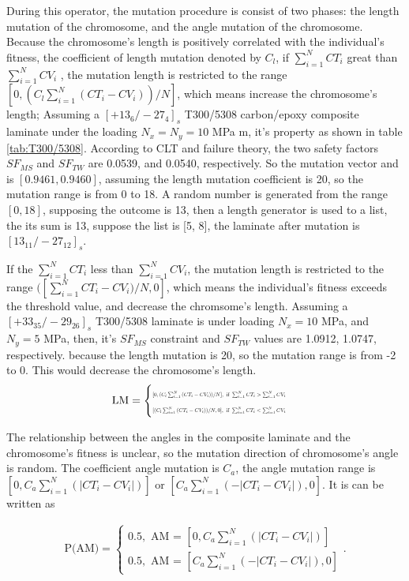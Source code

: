 
During this operator, the mutation procedure is consist of two phases: the length
mutation of the chromosome, and the angle mutation of the chromosome.  Because the
chromosome's length is positively correlated with the individual's fitness, the
coefficient of length mutation denoted by $C_l$, if $\sum_{i=1}^{N}{CT_i}$ great
than $\sum_{i=1}^{N}{CV_i}$ , the mutation length is restricted to the range
$[0,(C_l \sum_{i=1}^{N}{(CT_i-CV_i)})/N]$, which means increase the chromosome's
length; Assuming a $[+13_6/-27_4]_s$ T300/5308 carbon/epoxy composite
laminate under the loading $N_{x} = N_{y} = 10$ MPa m, it's property as shown
in table \ref{tab:T300/5308}. According to CLT and
failure theory, the two safety factors $SF_{MS}$ and $SF_{TW}$ are  0.0539, and
0.0540, respectively. So the mutation vector and is $[0.9461,0.9460]$, assuming
the length mutation coefficient is 20, so the mutation range is from 0 to 18. A
random number is generated from the range $[0, 18]$, supposing the outcome is
13, then a length generator is used to a list, the its sum is 13, suppose the
list is [5, 8], the laminate after mutation is $[13_{11}/-27_{12}]_s$.

If the $\sum_{i=1}^{N}{CT_i}$ less than $\sum_{i=1}^{N}{CV_i}$, the
mutation length is restricted to the range $([\sum_{i=1}^{N}{CT_i-CV_i})/N,0]$,
which means the individual's fitness exceeds the threshold value, and decrease
the chromsome's length.  Assuming a $[+33_{35}/-29_{26}]_s$ T300/5308 laminate
is under loading $N_{x}=10$ MPa, and $N_{y}=5$ MPa, then, it's $SF_{MS}$
constraint and $SF_{TW}$ values are  1.0912, 1.0747, respectively.
because the length mutation is 20, so the mutation range is from -2 to 0. This
would decrease the chromosome's length. 
\begin{align}
	\text{LM} = 
	\begin{cases}
		\resizebox{.35\textwidth}{!}{$[0,(C_l \sum_{i=1}^{N}{(CT_i-CV_i)})/N], \text{ if }  \sum_{i=1}^{N}{CT_i} > 
		\sum_{i=1}^{N}{CV_i}$}\\
		\resizebox{.35\textwidth}{!}{$[(C_l \sum_{i=1}^{N}{(CT_i-CV_i)})/N,0], \text{ if }  \sum_{i=1}^{N}{CT_i} < 
		\sum_{i=1}^{N}{CV_i}$}\\
	\end{cases} 
\end{align}

The relationship between the angles in the composite laminate and the
chromosome's fitness is unclear, so the mutation direction of chromosome's angle
is random. The coefficient angle mutation is $C_a$, the angle mutation range is
$[0,C_a \sum_{i=1}^{N}{(|CT_i-CV_i|)}]$ or $[C_a
\sum_{i=1}^{N}{(-|CT_i-CV_i|)},0]$. It is can be written as

\begin{align}
	\text{P(AM)} =  
	\begin{cases}
		0.5, \text{ AM = }[0,C_a \sum_{i=1}^{N}{(|CT_i-CV_i|)}] \\ 
	    0.5, \text{ AM = }[C_a \sum_{i=1}^{N}{(-|CT_i-CV_i|)},0]
	\end{cases} \textstyle{.}
\end{align}
